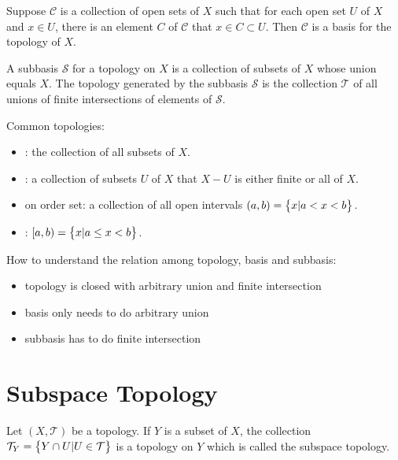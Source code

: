 \begin{theorem}
    Suppose $\mathcal{C}$ is a collection of open sets of $X$ such that for each open set $U$ of $X$ and $x \in U$, there is an element $C$ of $\mathcal{C}$ that $x \in C \subset U$. Then $\mathcal{C}$ is a basis for the topology of $X$.    
\end{theorem}


\begin{definition}
    A subbasis $\mathcal{S}$ for a topology on $X$ is a collection of subsets of $X$ whose union equals $X$. The topology generated by the subbasis $\mathcal{S}$ is the collection $\mathcal{T}$ of all unions of finite intersections of elements of $\mathcal{S}$.
\end{definition}


\begin{example}
    Common topologies:
\begin{itemize}
    \item {}: the collection of all subsets of $X$.
    \item {}: a collection of subsets $U$ of $X$ that $X - U$ is either finite or all of $X$.
    \item {} on order set: a collection of all open intervals $(a,b) = \set{x | a < x < b}$.
    \item {} : $[a,b) = \set{x | a \leq x < b}$.
\end{itemize}
\end{example}




How to understand the relation among topology, basis and subbasis:
\begin{itemize}
    \item topology is closed with arbitrary union and finite intersection
    \item basis only needs to do arbitrary union
    \item subbasis has to do finite intersection
\end{itemize}



\section{Subspace Topology}

\begin{definition}
    Let $(X, \mathcal{T})$ be a topology. If $Y$ is a subset of $X$, the collection $\mathcal{T}_{Y} = \set{Y \cap U | U \in \mathcal{T}}$ is a topology on $Y$ which is called the subspace topology.
\end{definition}

